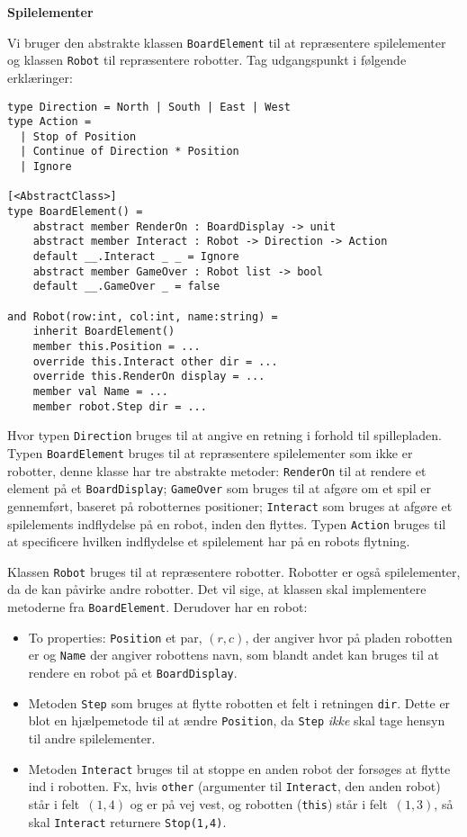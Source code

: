 \textbf{Spilelementer}

Vi bruger den abstrakte klassen \lstinline{BoardElement} til at
repræsentere spilelementer og klassen \lstinline{Robot} til
repræsentere robotter. Tag udgangspunkt i følgende
erklæringer:

\begin{lstlisting}
type Direction = North | South | East | West
type Action =
  | Stop of Position
  | Continue of Direction * Position
  | Ignore

[<AbstractClass>]
type BoardElement() =
    abstract member RenderOn : BoardDisplay -> unit
    abstract member Interact : Robot -> Direction -> Action
    default __.Interact _ _ = Ignore
    abstract member GameOver : Robot list -> bool
    default __.GameOver _ = false

and Robot(row:int, col:int, name:string) =
    inherit BoardElement()
    member this.Position = ...
    override this.Interact other dir = ...
    override this.RenderOn display = ...
    member val Name = ...
    member robot.Step dir = ...
\end{lstlisting}

Hvor typen \lstinline{Direction} bruges til at angive en retning i
forhold til spillepladen. Typen \lstinline{BoardElement} bruges til at
repræsentere spilelementer som ikke er robotter, denne klasse har tre
abstrakte metoder: \lstinline{RenderOn} til at rendere et element på
et \lstinline{BoardDisplay}; \lstinline{GameOver} som bruges til at
afgøre om et spil er gennemført, baseret på robotternes positioner;
\lstinline{Interact} som bruges at afgøre et spilelements indflydelse
på en robot, inden den flyttes. Typen \lstinline{Action} bruges til at
specificere hvilken indflydelse et spilelement har på en robots
flytning.

Klassen \lstinline{Robot} bruges til at repræsentere
robotter. Robotter er også spilelementer, da de kan påvirke andre
robotter. Det vil sige, at klassen skal implementere metoderne fra
\lstinline{BoardElement}. Derudover har en robot:
\begin{itemize}
\item To properties: \lstinline{Position} et par, $(r,c)$, der angiver
  hvor på pladen robotten er og \lstinline{Name} der angiver robottens
  navn, som blandt andet kan bruges til at rendere en robot på et
  \lstinline{BoardDisplay}.
\item Metoden \lstinline{Step} som bruges at flytte robotten et felt
  i retningen \lstinline{dir}. Dette er blot en hjælpemetode til at ændre
  \lstinline{Position}, da \lstinline{Step} \emph{ikke} skal tage
  hensyn til andre spilelementer.
\item Metoden \lstinline{Interact} bruges til at
  stoppe en anden robot der forsøges at flytte ind i robotten. Fx,
  hvis \lstinline{other} (argumenter til \lstinline{Interact}, den
  anden robot) står i felt~$(1,4)$ og er på vej vest, og robotten
  (\lstinline{this}) står i felt~$(1,3)$, så skal \lstinline{Interact}
  returnere \lstinline{Stop(1,4)}.
\end{itemize}

